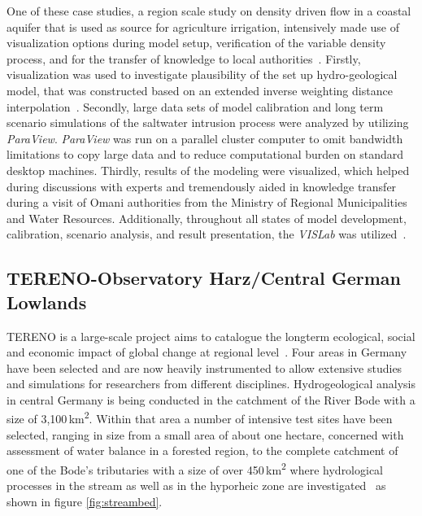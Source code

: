 \documentclass[twocolumn]{svjour3}          %
\begin{document}
One of these case studies, a region scale study on density driven flow in a coastal aquifer that is used as source for agriculture irrigation, intensively made use of visualization options during model setup, verification of the variable density process, and for the transfer of knowledge to local authorities~\cite{walther:cam, walther:eesenvirvis}. Firstly, visualization was used to investigate plausibility of the set up hydro-geological model, that was constructed based on an extended inverse weighting distance interpolation~\cite{walther:modelcare}. Secondly, large data sets of model calibration and long term scenario simulations of the saltwater intrusion process were analyzed by utilizing \emph{ParaView}. \emph{ParaView} was run on a parallel cluster computer to omit bandwidth limitations to copy large data and to reduce computational burden on standard desktop machines. Thirdly, results of the modeling were visualized, which helped during discussions with experts and tremendously aided in knowledge transfer during a visit of Omani authorities from the Ministry of Regional Municipalities and Water Resources. Additionally, throughout all states of model development, calibration, scenario analysis, and result presentation, the \emph{VISLab} was utilized~\cite{walther:eesenvirvis}.

\subsection{TERENO-Observatory Harz/Central German Lowlands}\label{tereno-bode}

TERENO is a large-scale project aims to catalogue the longterm ecological, social and economic impact of global change at regional level~\cite{zacharias:tereno}. Four areas in Germany have been selected and are now heavily instrumented to allow extensive studies and simulations for researchers from different disciplines. Hydrogeological analysis in central Germany is being conducted in the catchment of the River Bode with a size of 3,100\,km\textsuperscript{2}. Within that area a number of intensive test sites have been selected, ranging in size from a small area of about one hectare, concerned with assessment of water balance in a forested region, to the complete catchment of one of the Bode's tributaries with a size of over 450\,km\textsuperscript{2} where hydrological processes in the stream as well as in the hyporheic zone are investigated~\cite{schmidt:selke, trauth:flow} as shown in figure \ref{fig:streambed}.
\end{document}
